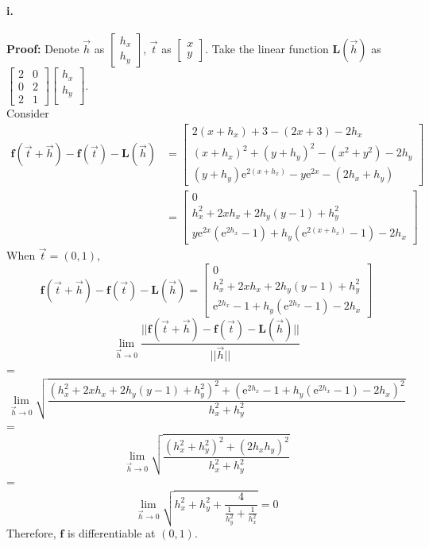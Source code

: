 \documentclass[11pt, a4paper]{article}
\begin{document}
\paragraph{i.}
\textbf{Proof:} Denote $\vec{h}$ as $\begin{bmatrix}
    h_x \\
    h_y
\end{bmatrix}$, $\vec{t}$ as
$\begin{bmatrix}
    x \\
    y
\end{bmatrix}$. 
Take the linear function $\bm{L}(\vec{h})$ as $\begin{bmatrix}
    2 & 0 \\
    0 & 2 \\
    2 & 1
\end{bmatrix}
\begin{bmatrix}
    h_x \\
    h_y \\
\end{bmatrix}$. \\ 
Consider
$$\begin{aligned}
    \bm{f}(\vec{t} + \vec{h}) - \bm{f}(\vec{t}) - \bm{L}(\vec{h}) &=
    \begin{bmatrix}
       2(x + h_x) + 3 - (2x + 3) - 2h_x \\
       (x + h_x) ^ 2 + (y + h_y) ^ 2 - (x ^ 2 + y ^ 2) - 2h_y \\
       (y + h_y)\mathrm{e} ^ {2(x + h_x)} - y\mathrm{e} ^ {2x} - (2h_x + h_y)
    \end{bmatrix} \\
    &=
    \begin{bmatrix}
        0 \\
        h_x ^ 2 + 2xh_x + 2h_y(y - 1) + h_y ^ 2 \\
        y\mathrm{e} ^ {2x} (\mathrm{e} ^ {2h_x} - 1) + h_y(\mathrm{e} ^ {2(x + h_x)} - 1) - 2h_x
    \end{bmatrix}
\end{aligned}$$
When $\vec{t} = (0, 1)$,
$$\bm{f}(\vec{t} + \vec{h}) - \bm{f}(\vec{t}) - \bm{L}(\vec{h}) = 
\begin{bmatrix}
    0 \\
    h_x ^ 2 + 2xh_x + 2h_y(y - 1) + h_y ^ 2 \\
    \mathrm{e} ^ {2h_x} - 1 + h_y(\mathrm{e} ^ {2h_x} - 1) - 2h_x
\end{bmatrix}$$
$$\lim_{\vec{h} \to 0} \frac{||\bm{f}(\vec{t} + \vec{h}) - \bm{f}(\vec{t}) - \bm{L}(\vec{h})||}{|| \vec{h} ||}$$
=
$$\lim_{\vec{h} \to 0} \sqrt{\frac{(h_x ^ 2 + 2xh_x + 2h_y(y - 1) + h_y ^ 2) ^ 2 + (\mathrm{e} ^ {2h_x} - 1 + h_y(\mathrm{e} ^ {2h_x} - 1) - 2h_x) ^ 2}{h_x ^ 2 + h_y ^ 2}}$$
=
$$\lim_{\vec{h} \to 0} \sqrt{\frac{(h_x ^ 2 + h_y ^ 2) ^ 2 + (2h_x h_y) ^ 2}{h_x ^ 2 + h_y ^ 2}}$$
=
$$\lim_{\vec{h} \to 0} \sqrt{h_x ^ 2 + h_y ^ 2 + \frac{4}{\frac{1}{h_y ^ 2} + \frac{1}{h_x ^ 2}}} = 0$$
Therefore, $\bm{f}$ is differentiable at $(0, 1)$.
\end{document}
